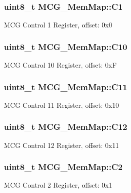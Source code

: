 \subsubsection[{C1}]{\setlength{\rightskip}{0pt plus 5cm}uint8\+\_\+t M\+C\+G\+\_\+\+Mem\+Map\+::\+C1}\label{struct_m_c_g___mem_map_a433a36d1aeb9d033b502ee263c1495a1}
M\+C\+G Control 1 Register, offset\+: 0x0 \hypertarget{struct_m_c_g___mem_map_a184325f5e5750f8e816b01aeed13d695}{}
\subsubsection[{C10}]{\setlength{\rightskip}{0pt plus 5cm}uint8\+\_\+t M\+C\+G\+\_\+\+Mem\+Map\+::\+C10}\label{struct_m_c_g___mem_map_a184325f5e5750f8e816b01aeed13d695}
M\+C\+G Control 10 Register, offset\+: 0x\+F \hypertarget{struct_m_c_g___mem_map_a75c88fec125448ba651f4853f99ecc11}{}
\subsubsection[{C11}]{\setlength{\rightskip}{0pt plus 5cm}uint8\+\_\+t M\+C\+G\+\_\+\+Mem\+Map\+::\+C11}\label{struct_m_c_g___mem_map_a75c88fec125448ba651f4853f99ecc11}
M\+C\+G Control 11 Register, offset\+: 0x10 \hypertarget{struct_m_c_g___mem_map_a51b6f129c0114441288747fbe336d1cb}{}
\subsubsection[{C12}]{\setlength{\rightskip}{0pt plus 5cm}uint8\+\_\+t M\+C\+G\+\_\+\+Mem\+Map\+::\+C12}\label{struct_m_c_g___mem_map_a51b6f129c0114441288747fbe336d1cb}
M\+C\+G Control 12 Register, offset\+: 0x11 \hypertarget{struct_m_c_g___mem_map_a7323696b9a1cb6631b8c04ffad3947e5}{}
\subsubsection[{C2}]{\setlength{\rightskip}{0pt plus 5cm}uint8\+\_\+t M\+C\+G\+\_\+\+Mem\+Map\+::\+C2}\label{struct_m_c_g___mem_map_a7323696b9a1cb6631b8c04ffad3947e5}
M\+C\+G Control 2 Register, offset\+: 0x1 \hypertarget{struct_m_c_g___mem_map_a58ca70b30279c98af3471abe38280f01}{}
